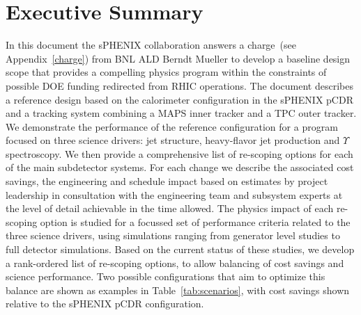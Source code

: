 \section*{Executive Summary}
\label{executive_summary}
\setcounter{page}{1}

\nocite{*}

In this document the sPHENIX collaboration answers a charge~(see
Appendix~\ref{charge}) from BNL ALD Berndt Mueller to develop a
baseline design scope that provides a compelling physics program
within the constraints of possible DOE funding redirected from RHIC
operations. The document describes a reference design based on the
calorimeter configuration in the sPHENIX pCDR and a tracking system
combining a MAPS inner tracker and a TPC outer tracker. We
demonstrate the performance of the reference configuration for a 
program focused on three science drivers: jet
structure, heavy-flavor jet production and $\Upsilon$ spectroscopy.
We then provide a comprehensive list of re-scoping options for each of
the main subdetector systems. For each change we describe the
associated cost savings, the engineering and schedule impact based on
estimates by project leadership in consultation with the engineering
team and subsystem experts at the level of detail achievable in the
time allowed.  The physics impact of each re-scoping option is studied
for a focussed set of performance criteria related to the three
science drivers, using simulations ranging from generator level
studies to full detector simulations. Based on the current status of
these studies, we develop a rank-ordered list of re-scoping options,
to allow balancing of cost savings and science
performance. Two possible configurations that aim to optimize this 
balance are shown as examples in Table~\ref{tab:scenarios},
with cost savings shown relative to the sPHENIX pCDR configuration.


